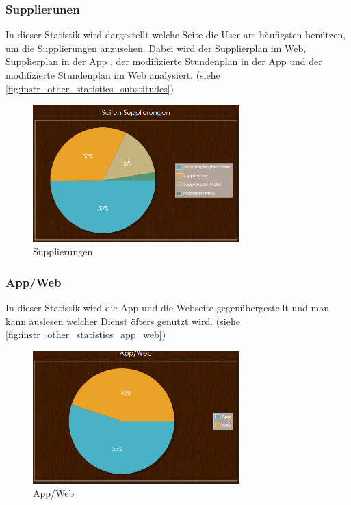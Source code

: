 \subsubsection{Supplierunen}
In dieser Statistik wird dargestellt welche Seite die User am häufigsten benützen, um die Supplierungen anzusehen. Dabei wird der Supplierplan im Web, Supplierplan in der App , der modifizierte Stundenplan in der App und der modifizierte Stundenplan im Web analysiert. (siehe \autoref{fig:instr_other_statistics_substitudes})
\begin{figure}[H]
\centering
\includegraphics[keepaspectratio=true, width=8cm]{images/screenshots/statistics_substitudes.png}
\caption{Supplierungen}
\label{fig:instr_other_statistics_substitudes}
\end{figure}
\subsubsection{App/Web}
In dieser Statistik wird die App und die Webseite gegenübergestellt und man kann auslesen welcher Dienst öfters genutzt wird. (siehe \autoref{fig:instr_other_statistics_app_web})
\begin{figure}[H]
\centering
\includegraphics[keepaspectratio=true, width=8cm]{images/screenshots/statistics_app_web.png}
\caption{App/Web}
\label{fig:instr_other_statistics_app_web}
\end{figure}

